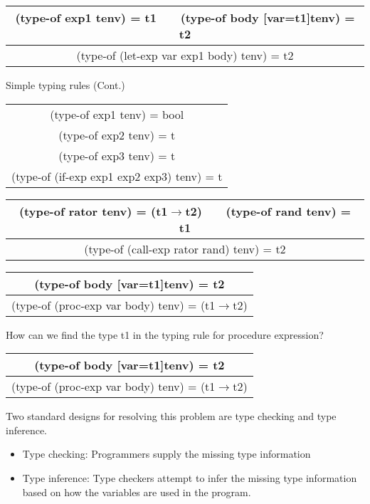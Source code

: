 \documentclass{article}
\begin{document}
\begin{huge}
\begin{tabular}{c}
(type-of exp1 tenv) = t1 \ \ \ (type-of body [var=t1]tenv) = t2  \\ \hline
(type-of (let-exp var exp1 body) tenv) = t2
\end{tabular}


Simple typing rules (Cont.)

\begin{tabular}{c}
(type-of exp1 tenv) = bool  \\
(type-of exp2 tenv) = t \\
(type-of exp3 tenv) = t \\ \hline
(type-of (if-exp exp1 exp2 exp3) tenv) = t
\end{tabular}

\begin{tabular}{c}
(type-of rator tenv) = (t1$\rightarrow$t2) \ \ \ (type-of rand tenv) = t1  \\ \hline
(type-of (call-exp rator rand) tenv) = t2
\end{tabular}

\begin{tabular}{c}
(type-of body [var=t1]tenv) = t2  \\ \hline
(type-of (proc-exp var body) tenv) = (t1$\rightarrow$t2)
\end{tabular}


How can we find the type t1 in the typing rule for procedure expression?

\begin{tabular}{c}
(type-of body [var=t1]tenv) = t2  \\ \hline
(type-of (proc-exp var body) tenv) = (t1$\rightarrow$t2)
\end{tabular}

Two standard designs for resolving this problem are type checking and type inference.
\begin{itemize}
\item Type checking: Programmers supply the missing type information
\item Type inference: Type checkers attempt to infer the missing type information based on how the variables are used in the program.
\end{itemize}



\end{huge}
\end{document}
